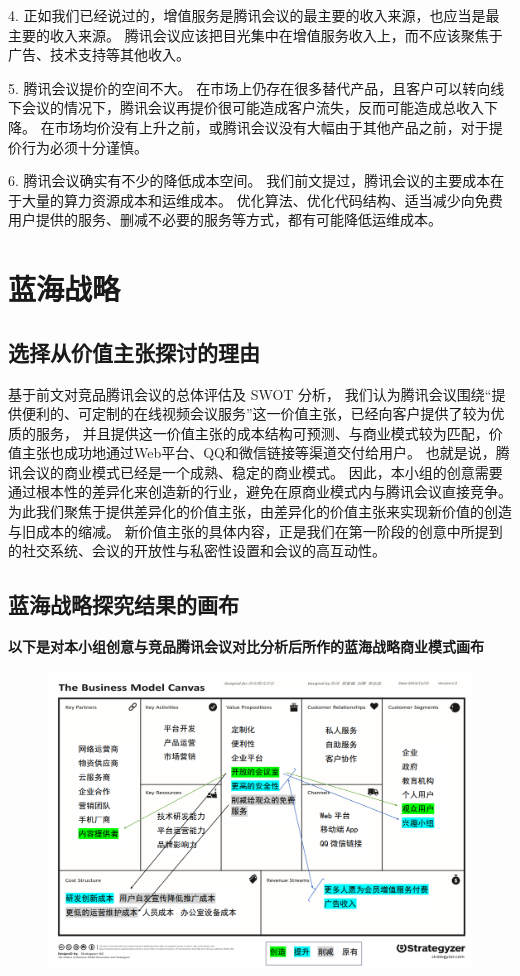 \documentclass[a4paper,12pt]{article}
\begin{document}
    4.
    正如我们已经说过的，增值服务是腾讯会议的最主要的收入来源，也应当是最主要的收入来源。
    腾讯会议应该把目光集中在增值服务收入上，而不应该聚焦于广告、技术支持等其他收入。


    5.
    腾讯会议提价的空间不大。
    在市场上仍存在很多替代产品，且客户可以转向线下会议的情况下，腾讯会议再提价很可能造成客户流失，反而可能造成总收入下降。
    在市场均价没有上升之前，或腾讯会议没有大幅由于其他产品之前，对于提价行为必须十分谨慎。

    6.
    腾讯会议确实有不少的降低成本空间。
    我们前文提过，腾讯会议的主要成本在于大量的算力资源成本和运维成本。
    优化算法、优化代码结构、适当减少向免费用户提供的服务、删减不必要的服务等方式，都有可能降低运维成本。

    
    \section{蓝海战略}

    
    \subsection{选择从价值主张探讨的理由}
    基于前文对竞品腾讯会议的总体评估及 SWOT 分析，
    我们认为腾讯会议围绕“提供便利的、可定制的在线视频会议服务”这一价值主张，已经向客户提供了较为优质的服务，
    并且提供这一价值主张的成本结构可预测、与商业模式较为匹配，价值主张也成功地通过Web平台、QQ和微信链接等渠道交付给用户。
    也就是说，腾讯会议的商业模式已经是一个成熟、稳定的商业模式。
    因此，本小组的创意需要通过根本性的差异化来创造新的行业，避免在原商业模式内与腾讯会议直接竞争。
    为此我们聚焦于提供差异化的价值主张，由差异化的价值主张来实现新价值的创造与旧成本的缩减。
    新价值主张的具体内容，正是我们在第一阶段的创意中所提到的社交系统、会议的开放性与私密性设置和会议的高互动性。
    
    \subsection{蓝海战略探究结果的画布}
    \textbf{以下是对本小组创意与竞品腾讯会议对比分析后所作的蓝海战略商业模式画布}
    \clearpage
    \begin{figure}[htbp]
        \centering
        \includegraphics[scale=0.4]{png/蓝海战略}
        \caption{}
        \label{fig:buleSea}
    \end{figure}
\end{document}
